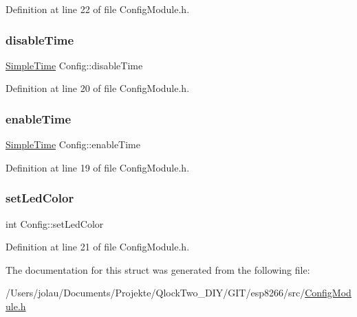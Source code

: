 Definition at line 22 of file Config\+Module.\+h.

\mbox{\label{struct_config_ac16d52dba7a69c2675a7227d5e997f42}} 
\subsubsection{\texorpdfstring{disableTime}{disableTime}}
{\footnotesize\ttfamily \mbox{\hyperlink{class_simple_time}{Simple\+Time}} Config\+::disable\+Time}



Definition at line 20 of file Config\+Module.\+h.

\mbox{\label{struct_config_ab9e6019425ef494d061ef3d82e999b51}} 
\subsubsection{\texorpdfstring{enableTime}{enableTime}}
{\footnotesize\ttfamily \mbox{\hyperlink{class_simple_time}{Simple\+Time}} Config\+::enable\+Time}



Definition at line 19 of file Config\+Module.\+h.

\mbox{\label{struct_config_afa51e4de07b10608a065b4d1966c579c}} 
\subsubsection{\texorpdfstring{setLedColor}{setLedColor}}
{\footnotesize\ttfamily int Config\+::set\+Led\+Color}



Definition at line 21 of file Config\+Module.\+h.



The documentation for this struct was generated from the following file\+:\begin{DoxyCompactItemize}
\item 
/\+Users/jolau/\+Documents/\+Projekte/\+Qlock\+Two\+\_\+\+D\+I\+Y/\+G\+I\+T/esp8266/src/\mbox{\hyperlink{_config_module_8h}{Config\+Module.\+h}}\end{DoxyCompactItemize}
